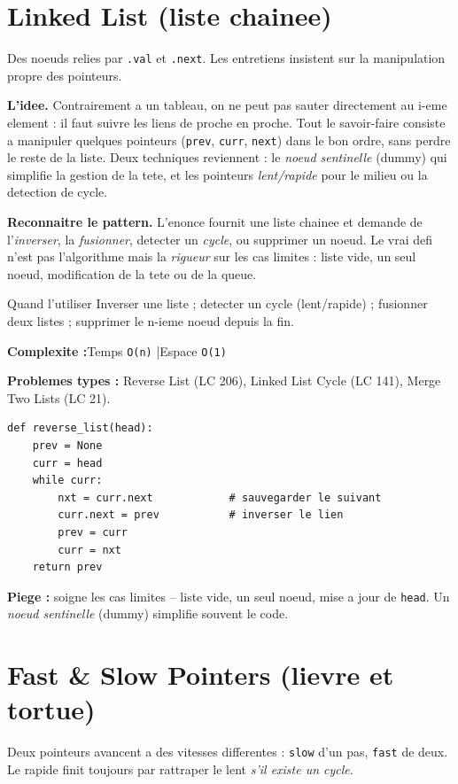 \documentclass[11pt,a4paper]{article}
\newcommand{\complexite}[2]{%
  \noindent\textbf{Complexite :}\quad Temps \texttt{#1} \quad|\quad Espace \texttt{#2}\par\smallskip}
\newcommand{\leetcode}[1]{\noindent\textbf{Problemes types :} #1\par\medskip}
\begin{document}
\section{Linked List (liste chainee)}
Des noeuds relies par \texttt{.val} et \texttt{.next}. Les entretiens insistent
sur la manipulation propre des pointeurs.

\textbf{L'idee.} Contrairement a un tableau, on ne peut pas sauter directement au
i-eme element : il faut suivre les liens de proche en proche. Tout le savoir-faire
consiste a manipuler quelques pointeurs (\texttt{prev}, \texttt{curr},
\texttt{next}) dans le bon ordre, sans perdre le reste de la liste. Deux
techniques reviennent : le \emph{noeud sentinelle} (dummy) qui simplifie la
gestion de la tete, et les pointeurs \emph{lent/rapide} pour le milieu ou la
detection de cycle.

\textbf{Reconnaitre le pattern.} L'enonce fournit une liste chainee et demande de
l'\emph{inverser}, la \emph{fusionner}, detecter un \emph{cycle}, ou supprimer un
noeud. Le vrai defi n'est pas l'algorithme mais la \emph{rigueur} sur les cas
limites : liste vide, un seul noeud, modification de la tete ou de la queue.

\begin{infobox}{Quand l'utiliser}
Inverser une liste ; detecter un cycle (lent/rapide) ; fusionner deux listes ;
supprimer le n-ieme noeud depuis la fin.
\end{infobox}

\complexite{O(n)}{O(1)}
\leetcode{Reverse List (LC 206), Linked List Cycle (LC 141), Merge Two Lists (LC 21).}

\begin{lstlisting}
def reverse_list(head):
    prev = None
    curr = head
    while curr:
        nxt = curr.next            # sauvegarder le suivant
        curr.next = prev           # inverser le lien
        prev = curr
        curr = nxt
    return prev
\end{lstlisting}

\textbf{Piege :} soigne les cas limites -- liste vide, un seul noeud, mise a jour
de \texttt{head}. Un \emph{noeud sentinelle} (dummy) simplifie souvent le code.

\section{Fast \& Slow Pointers (lievre et tortue)}
Deux pointeurs avancent a des vitesses differentes : \texttt{slow} d'un pas,
\texttt{fast} de deux. Le rapide finit toujours par rattraper le lent \emph{s'il
existe un cycle}.
\end{document}
